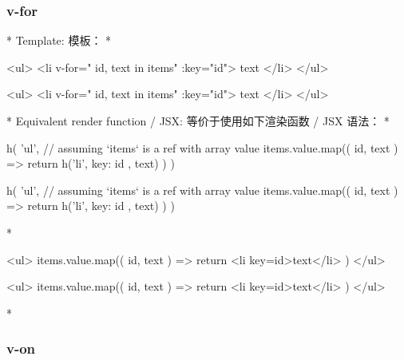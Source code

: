 \begin{paracol}{2}
\subsubsection{v-for}
\switchcolumn[0]*%
Template:
\switchcolumn
模板：
\switchcolumn[0]*%
\begin{codeHtml}
<ul>
  <li v-for="{ id, text } in items" :key="id">
    {{ text }}
  </li>
</ul>
\end{codeHtml}
\switchcolumn
\begin{codeHtml}
<ul>
  <li v-for="{ id, text } in items" :key="id">
    {{ text }}
  </li>
</ul>
\end{codeHtml}
\switchcolumn[0]*%
Equivalent render function / JSX:
\switchcolumn
等价于使用如下渲染函数 / JSX 语法：
\switchcolumn[0]*%
\begin{codeJs}
h(
  'ul',
  // assuming `items` is a ref with array value
  items.value.map(({ id, text }) => {
    return h('li', { key: id }, text)
  })
)
\end{codeJs}
\switchcolumn
\begin{codeJs}
h(
  'ul',
  // assuming `items` is a ref with array value
  items.value.map(({ id, text }) => {
    return h('li', { key: id }, text)
  })
)
\end{codeJs}
\switchcolumn[0]*%
\begin{codeHtml}
<ul>
  {items.value.map(({ id, text }) => {
    return <li key={id}>{text}</li>
  })}
</ul>
\end{codeHtml}
\switchcolumn
\begin{codeHtml}
<ul>
  {items.value.map(({ id, text }) => {
    return <li key={id}>{text}</li>
  })}
</ul>
\end{codeHtml}
\switchcolumn[0]*%
\subsubsection{v-on}
\switchcolumn

\end{paracol}
